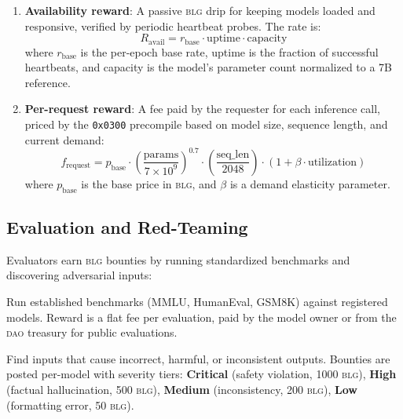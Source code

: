 \documentclass[11pt,letterpaper]{article}
\newcommand{\BLG}{\textsc{blg}}
\newcommand{\DAO}{\textsc{dao}}
\begin{document}
\begin{enumerate}
    \item \textbf{Availability reward}: A passive \BLG{} drip for keeping models loaded and responsive, verified by periodic heartbeat probes. The rate is:
    \begin{equation}
    R_{\text{avail}} = r_{\text{base}} \cdot \text{uptime} \cdot \text{capacity}
    \end{equation}
    where $r_{\text{base}}$ is the per-epoch base rate, uptime is the fraction of successful heartbeats, and capacity is the model's parameter count normalized to a 7B reference.

    \item \textbf{Per-request reward}: A fee paid by the requester for each inference call, priced by the \texttt{0x0300} precompile based on model size, sequence length, and current demand:
    \begin{equation}
    f_{\text{request}} = p_{\text{base}} \cdot \left(\frac{\text{params}}{7 \times 10^9}\right)^{0.7} \cdot \left(\frac{\text{seq\_len}}{2048}\right) \cdot (1 + \beta \cdot \text{utilization})
    \end{equation}
    where $p_{\text{base}}$ is the base price in \BLG{}, and $\beta$ is a demand elasticity parameter.
\end{enumerate}

\subsection{Evaluation and Red-Teaming}

Evaluators earn \BLG{} bounties by running standardized benchmarks and discovering adversarial inputs:

\begin{description}[nosep]
    \item[Benchmark execution] Run established benchmarks (MMLU, HumanEval, GSM8K) against registered models. Reward is a flat fee per evaluation, paid by the model owner or from the \DAO{} treasury for public evaluations.
    \item[Adversarial discovery] Find inputs that cause incorrect, harmful, or inconsistent outputs. Bounties are posted per-model with severity tiers: \textbf{Critical} (safety violation, 1000 \BLG{}), \textbf{High} (factual hallucination, 500 \BLG{}), \textbf{Medium} (inconsistency, 200 \BLG{}), \textbf{Low} (formatting error, 50 \BLG{}).
\end{description}
\end{document}
